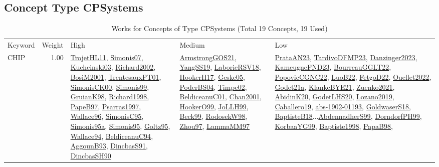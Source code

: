 \subsection{Concept Type CPSystems}
\label{sec:CPSystems}
\label{CPSystems}
{\scriptsize
\begin{longtable}{p{3cm}r>{\raggedright\arraybackslash}p{6cm}>{\raggedright\arraybackslash}p{6cm}>{\raggedright\arraybackslash}p{8cm}}
\rowcolor{white}\caption{Works for Concepts of Type CPSystems (Total 19 Concepts, 19 Used)}\\ \toprule
\rowcolor{white}Keyword & Weight & High & Medium & Low\\ \midrule\endhead
\bottomrule
\endfoot
\index{CHIP}\index{CPSystems!CHIP}CHIP &  1.00 & \hyperref[detail:TrojetHL11]{TrojetHL11}, \hyperref[detail:Simonis07]{Simonis07}, \hyperref[detail:Kuchcinski03]{Kuchcinski03}, \hyperref[detail:Richard2002]{Richard2002}, \hyperref[detail:BosiM2001]{BosiM2001}, \hyperref[detail:TrentesauxPT01]{TrentesauxPT01}, \hyperref[detail:SimonisCK00]{SimonisCK00}, \hyperref[detail:Simonis99]{Simonis99}, \hyperref[detail:GruianK98]{GruianK98}, \hyperref[detail:Richard1998]{Richard1998}, \hyperref[detail:PapeB97]{PapeB97}, \hyperref[detail:Psarras1997]{Psarras1997}, \hyperref[detail:Wallace96]{Wallace96}, \hyperref[detail:SimonisC95]{SimonisC95}, \hyperref[detail:Simonis95a]{Simonis95a}, \hyperref[detail:Simonis95]{Simonis95}, \hyperref[detail:Goltz95]{Goltz95}, \hyperref[detail:Wallace94]{Wallace94}, \hyperref[detail:BeldiceanuC94]{BeldiceanuC94}, \hyperref[detail:AggounB93]{AggounB93}, \hyperref[detail:DincbasS91]{DincbasS91}, \hyperref[detail:DincbasSH90]{DincbasSH90} & \hyperref[detail:ArmstrongGOS21]{ArmstrongGOS21}, \hyperref[detail:YangSS19]{YangSS19}, \hyperref[detail:LaborieRSV18]{LaborieRSV18}, \hyperref[detail:HookerH17]{HookerH17}, \hyperref[detail:Geske05]{Geske05}, \hyperref[detail:PoderBS04]{PoderBS04}, \hyperref[detail:Timpe02]{Timpe02}, \hyperref[detail:BeldiceanuC01]{BeldiceanuC01}, \hyperref[detail:Chan2001]{Chan2001}, \hyperref[detail:HookerO99]{HookerO99}, \hyperref[detail:JoLLH99]{JoLLH99}, \hyperref[detail:Beck99]{Beck99}, \hyperref[detail:RodosekW98]{RodosekW98}, \hyperref[detail:Zhou97]{Zhou97}, \hyperref[detail:LammaMM97]{LammaMM97} & \hyperref[detail:PrataAN23]{PrataAN23}, \hyperref[detail:TardivoDFMP23]{TardivoDFMP23}, \hyperref[detail:Danzinger2023]{Danzinger2023}, \hyperref[detail:KameugneFND23]{KameugneFND23}, \hyperref[detail:BourreauGGLT22]{BourreauGGLT22}, \hyperref[detail:PopovicCGNC22]{PopovicCGNC22}, \hyperref[detail:LuoB22]{LuoB22}, \hyperref[detail:FetgoD22]{FetgoD22}, \hyperref[detail:Ouellet2022]{Ouellet2022}, \hyperref[detail:Godet21a]{Godet21a}, \hyperref[detail:KlankeBYE21]{KlankeBYE21}, \hyperref[detail:Zuenko2021]{Zuenko2021}, \hyperref[detail:AbidinK20]{AbidinK20}, \hyperref[detail:GodetLHS20]{GodetLHS20}, \hyperref[detail:Lozano2019]{Lozano2019}, \hyperref[detail:Caballero19]{Caballero19}, \hyperref[detail:abs-1902-01193]{abs-1902-01193}, \hyperref[detail:GoldwaserS18]{GoldwaserS18}, \hyperref[detail:BaptisteB18]{BaptisteB18}...\hyperref[detail:AbdennadherS99]{AbdennadherS99}, \hyperref[detail:DorndorfPH99]{DorndorfPH99}, \hyperref[detail:KorbaaYG99]{KorbaaYG99}, \hyperref[detail:Baptiste1998]{Baptiste1998}, \hyperref[detail:PapaB98]{PapaB98}, 
\end{longtable}}
